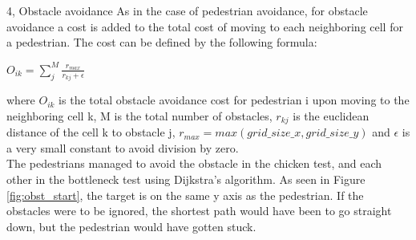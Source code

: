 \documentclass[10pt,a4paper]{article}
\begin{document}
\begin{task}{4, Obstacle avoidance}
As in the case of pedestrian avoidance, for obstacle avoidance a cost is added to the total cost of moving to each neighboring cell for a pedestrian. The cost can be defined by the following formula:

\begin{center}
$O_{ik} = \sum_{j}^{M} \frac{r_{max}}{r_{kj} + \epsilon }$
\end{center}
where $O_{ik}$ is the total obstacle avoidance cost for pedestrian i upon moving to the neighboring cell k, M is the total number of obstacles, $r_{kj}$ is the euclidean distance of the cell k to obstacle j, $r_{max} = max(grid\_size\_x, grid\_size\_y)$ and $\epsilon$ is a very small constant to avoid division by zero.\\ 
The pedestrians managed to avoid the obstacle in the chicken test, and each other in the bottleneck test using Dijkstra’s algorithm.
As seen in Figure \ref{fig:obst_start}, the target is on the same y axis as the pedestrian. If the obstacles were to be ignored, the shortest path would have been to go straight down, but the pedestrian would have gotten stuck. \\


\end{task}
\end{document}

